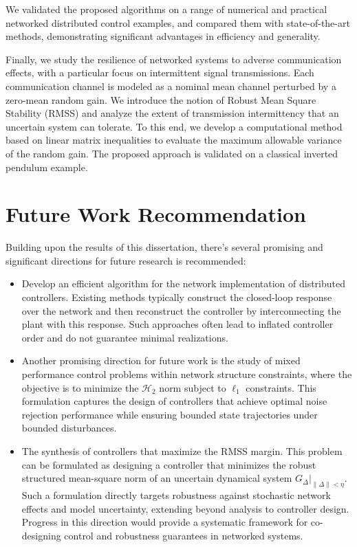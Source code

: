 We validated the proposed algorithms on a range of numerical and practical networked distributed control examples, and compared them with state-of-the-art methods, demonstrating significant advantages in efficiency and generality.

Finally, we study the resilience of networked systems to adverse communication effects, with a particular focus on intermittent signal transmissions. Each communication channel is modeled as a nominal mean channel perturbed by a zero-mean random gain. We introduce the notion of Robust Mean Square Stability (RMSS) and analyze the extent of transmission intermittency that an uncertain system can tolerate. To this end, we develop a computational method based on linear matrix inequalities to evaluate the maximum allowable variance of the random gain. The proposed approach is validated on a classical inverted pendulum example.

\section{Future Work Recommendation}
Building upon the results of this dissertation, there's several promising and significant directions for future research is recommended:
\begin{itemize}
    \item Develop an efficient algorithm for the network implementation of distributed controllers. Existing methods typically construct the closed-loop response over the network and then reconstruct the controller by interconnecting the plant with this response. Such approaches often lead to inflated controller order and do not guarantee minimal realizations.
    \item Another promising direction for future work is the study of mixed performance control problems within network structure constraints, where the objective is to minimize the $\mathcal{H}_2$ norm subject to $\ell_1$ constraints. This formulation captures the design of controllers that achieve optimal noise rejection performance while ensuring bounded state trajectories under bounded disturbances.
    \item The synthesis of controllers that maximize the RMSS margin. This problem can be formulated as designing a controller that minimizes the robust structured mean-square norm of an uncertain dynamical system $G_\Delta\vert_{\|\Delta\|<\eta}$. Such a formulation directly targets robustness against stochastic network effects and model uncertainty, extending beyond analysis to controller design. Progress in this direction would provide a systematic framework for co-designing control and robustness guarantees in networked systems.
\end{itemize}


